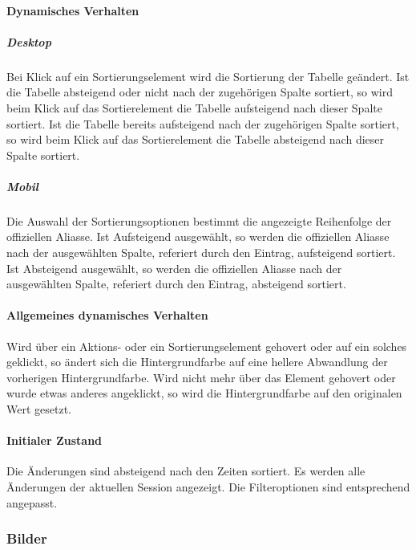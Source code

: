 \paragraph*{Dynamisches Verhalten}
\subparagraph*{Desktop}
Bei Klick auf ein Sortierungselement wird die Sortierung der Tabelle geändert.
Ist die Tabelle absteigend oder nicht nach der zugehörigen Spalte sortiert, so wird beim Klick auf das Sortierelement die Tabelle aufsteigend nach dieser Spalte sortiert.
Ist die Tabelle bereits aufsteigend nach der zugehörigen Spalte sortiert, so wird beim Klick auf das Sortierelement die Tabelle absteigend nach dieser Spalte sortiert.

\subparagraph*{Mobil}
Die Auswahl der Sortierungsoptionen bestimmt die angezeigte Reihenfolge der offiziellen Aliasse.
Ist \dq Aufsteigend \dq{} ausgewählt, so werden die offiziellen Aliasse nach der ausgewählten Spalte, referiert durch den Eintrag, aufsteigend sortiert.
Ist \dq Absteigend \dq{} ausgewählt, so werden die offiziellen Aliasse nach der ausgewählten Spalte, referiert durch den Eintrag, absteigend sortiert.

\paragraph*{Allgemeines dynamisches Verhalten}
Wird über ein Aktions- oder ein Sortierungselement gehovert oder auf ein solches geklickt, so ändert sich die Hintergrundfarbe auf eine hellere Abwandlung der vorherigen Hintergrundfarbe.
Wird nicht mehr über das Element gehovert oder wurde etwas anderes angeklickt, so wird die Hintergrundfarbe auf den originalen Wert gesetzt.

\paragraph*{Initialer Zustand}
Die Änderungen sind absteigend nach den Zeiten sortiert.
Es werden alle Änderungen der aktuellen Session angezeigt.
Die Filteroptionen sind entsprechend angepasst.

\subsubsection*{Bilder}
\begin{minipage}{\linewidth}
    \centering
    \begin{minipage}{.69\textwidth}
        \captionsetup[figure]{labelformat=empty}
        \captionsetup[figure]{labelformat=default}
    \end{minipage}
    \begin{minipage}{.3\textwidth}
        \captionsetup[figure]{labelformat=empty}
        \captionsetup[figure]{labelformat=default}
    \end{minipage}
\end{minipage}